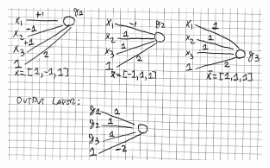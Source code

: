 \documentclass[a4paper,11pt,oneside]{book}
\begin{document}
\begin{enumerate}
\begin{solution}
\begin{itemize}
            \end{itemize}
            \begin{figure}[H]
                \centering
                \includegraphics[width=0.6\textwidth,height=0.6\textheight,keepaspectratio]{images/graph_3_3_Feb_2022.png}
            \end{figure}
            \end{solution}
    \end{enumerate}
\end{document}
